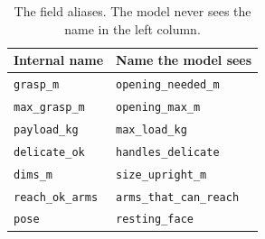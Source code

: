 \begin{table}[H]
\centering
\caption{The field aliases. The model never sees the name in the left column.}
\label{tab:appC:aliases}
\begin{tabular}{ll}
\toprule
Internal name & Name the model sees \\
\midrule
\texttt{grasp\_m} & \texttt{opening\_needed\_m} \\
\texttt{max\_grasp\_m} & \texttt{opening\_max\_m} \\
\texttt{payload\_kg} & \texttt{max\_load\_kg} \\
\texttt{delicate\_ok} & \texttt{handles\_delicate} \\
\texttt{dims\_m} & \texttt{size\_upright\_m} \\
\texttt{reach\_ok\_arms} & \texttt{arms\_that\_can\_reach} \\
\texttt{pose} & \texttt{resting\_face} \\
\bottomrule
\end{tabular}
\end{table}
